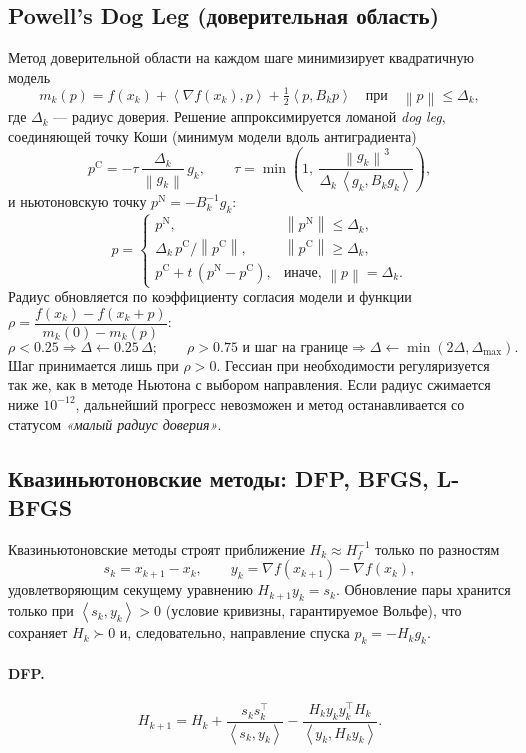\documentclass[a4paper,12pt]{article}
\newcommand{\norm}[1]{\left\|#1\right\|}
\newcommand{\grad}{\nabla}
\newcommand{\inner}[2]{\left\langle #1, #2 \right\rangle}
\theoremstyle{definition}
\begin{document}
\subsection{Powell's Dog Leg (доверительная область)}

Метод доверительной области на каждом шаге минимизирует квадратичную модель
\[
    m_k(p) = f(x_k) + \inner{\grad f(x_k)}{p} + \tfrac12 \inner{p}{B_k p}
    \quad \text{при} \quad \norm{p} \leq \Delta_k,
\]
где $\Delta_k$ — радиус доверия. Решение аппроксимируется ломаной \emph{dog leg}, соединяющей
точку Коши (минимум модели вдоль антиградиента)
\[
    p^{\text{C}} = -\tau\,\frac{\Delta_k}{\norm{g_k}}\, g_k, \qquad
    \tau = \min\!\left(1,\ \frac{\norm{g_k}^3}{\Delta_k\, \inner{g_k}{B_k g_k}}\right),
\]
и ньютоновскую точку $p^{\text{N}} = -B_k^{-1} g_k$:
\[
    p =
    \begin{cases}
        p^{\text{N}}, & \norm{p^{\text{N}}} \leq \Delta_k,\\[2pt]
        \Delta_k\, p^{\text{C}}/\norm{p^{\text{C}}}, & \norm{p^{\text{C}}} \geq \Delta_k,\\[2pt]
        p^{\text{C}} + t\,(p^{\text{N}} - p^{\text{C}}), & \text{иначе, } \norm{p}=\Delta_k.
    \end{cases}
\]
Радиус обновляется по коэффициенту согласия модели и функции
$\rho = \dfrac{f(x_k) - f(x_k + p)}{m_k(0) - m_k(p)}$:
\[
    \rho < 0.25 \Rightarrow \Delta \leftarrow 0.25\,\Delta; \qquad
    \rho > 0.75 \text{ и шаг на границе} \Rightarrow \Delta \leftarrow \min(2\Delta, \Delta_{\max}).
\]
Шаг принимается лишь при $\rho > 0$. Гессиан при необходимости регуляризуется так же, как в
методе Ньютона с выбором направления. Если радиус сжимается ниже $10^{-12}$, дальнейший прогресс
невозможен и метод останавливается со статусом \textit{«малый радиус доверия»}.

\subsection{Квазиньютоновские методы: DFP, BFGS, L-BFGS}

Квазиньютоновские методы строят приближение $H_k \approx H_f^{-1}$ только по разностям
\[
    s_k = x_{k+1} - x_k, \qquad y_k = \grad f(x_{k+1}) - \grad f(x_k),
\]
удовлетворяющим секущему уравнению $H_{k+1} y_k = s_k$. Обновление пары хранится только при
$\inner{s_k}{y_k} > 0$ (условие кривизны, гарантируемое Вольфе), что сохраняет $H_k \succ 0$ и,
следовательно, направление спуска $p_k = -H_k g_k$.

\paragraph{DFP.}
\[
    H_{k+1} = H_k + \frac{s_k s_k^\top}{\inner{s_k}{y_k}}
    - \frac{H_k y_k y_k^\top H_k}{\inner{y_k}{H_k y_k}}.
\]
\end{document}
